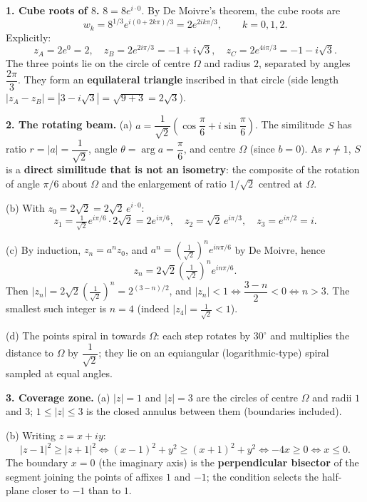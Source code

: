 \documentclass[11pt]{article}
\newcommand{\cle}[1]{{\popxbold\color{popdark}#1}}
\begin{document}
\begin{exoresolu}
\textbf{1. Cube roots of $8$.} 
$8 = 8e^{i\cdot 0}$. By De Moivre's theorem, the cube roots are
\[ w_k = 8^{1/3} e^{i(0 + 2k\pi)/3} = 2e^{2ik\pi/3}, \qquad k = 0, 1, 2. \]
Explicitly:
\[ z_A = 2e^{0} = 2, \quad z_B = 2e^{2i\pi/3} = -1 + i\sqrt{3}, \quad z_C = 2e^{4i\pi/3} = -1 - i\sqrt{3}. \]
The three points lie on the circle of centre $\Omega$ and radius $2$, separated by angles $\dfrac{2\pi}{3}$. They form an \textbf{equilateral triangle} inscribed in that circle (side length $|z_A - z_B| = |3 - i\sqrt{3}| = \sqrt{9+3} = 2\sqrt{3}$).

\textbf{2. The rotating beam.} 
(a) $a = \dfrac{1}{\sqrt{2}}\left(\cos\dfrac{\pi}{6} + i\sin\dfrac{\pi}{6}\right)$. The similitude $S$ has \cle{ratio} $r = |a| = \dfrac{1}{\sqrt{2}}$, \cle{angle} $\theta = \arg a = \dfrac{\pi}{6}$, and \cle{centre} $\Omega$ (since $b = 0$). As $r \ne 1$, $S$ is a \textbf{direct similitude that is not an isometry}: the composite of the rotation of angle $\pi/6$ about $\Omega$ and the enlargement of ratio $1/\sqrt{2}$ centred at $\Omega$.

(b) With $z_0 = 2\sqrt{2} = 2\sqrt{2}\,e^{i\cdot 0}$:
\[ z_1 = \tfrac{1}{\sqrt{2}}e^{i\pi/6}\cdot 2\sqrt{2} = 2e^{i\pi/6}, \quad z_2 = \sqrt{2}\,e^{i\pi/3}, \quad z_3 = e^{i\pi/2} = i. \]

(c) By induction, $z_n = a^n z_0$, and $a^n = \left(\tfrac{1}{\sqrt{2}}\right)^{\!n} e^{in\pi/6}$ by De Moivre, hence
\[ z_n = 2\sqrt{2}\left(\tfrac{1}{\sqrt{2}}\right)^{\!n} e^{in\pi/6}. \]
Then $|z_n| = 2\sqrt{2}\left(\tfrac{1}{\sqrt{2}}\right)^{n} = 2^{(3-n)/2}$, and $|z_n| < 1 \iff \dfrac{3-n}{2} < 0 \iff n > 3$. The smallest such integer is $\boxed{n = 4}$ (indeed $|z_4| = \tfrac{1}{\sqrt{2}} < 1$).

(d) The points spiral in towards $\Omega$: each step rotates by $30^{\circ}$ and multiplies the distance to $\Omega$ by $\dfrac{1}{\sqrt{2}}$; they lie on an equiangular (logarithmic-type) spiral sampled at equal angles.

\textbf{3. Coverage zone.} 
(a) $|z| = 1$ and $|z| = 3$ are the circles of centre $\Omega$ and radii $1$ and $3$; $1 \le |z| \le 3$ is the closed annulus between them (boundaries included).

(b) Writing $z = x + iy$:
\[ |z-1|^2 \ge |z+1|^2 \iff (x-1)^2 + y^2 \ge (x+1)^2 + y^2 \iff -4x \ge 0 \iff x \le 0. \]
The boundary $x = 0$ (the imaginary axis) is the \textbf{perpendicular bisector} of the segment joining the points of affixes $1$ and $-1$; the condition selects the half-plane closer to $-1$ than to $1$.


\end{exoresolu}
\end{document}
